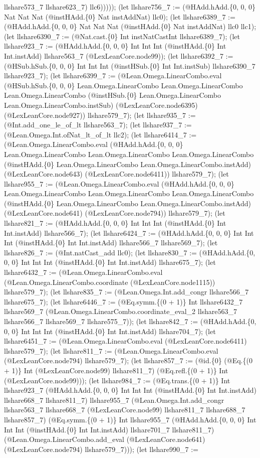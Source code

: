 \documentclass[11pt]{article}
\begin{document}
llshare573\_7 llshare623\_7) llc6))))); (let llshare756\_7 := (@HAdd.hAdd.\{0, 0, 0\} Nat Nat Nat (@instHAdd.\{0\} Nat instAddNat) llc0); (let llshare6389\_7 := (@HAdd.hAdd.\{0, 0, 0\} Nat Nat Nat (@instHAdd.\{0\} Nat instAddNat) llc0 llc1); (let llshare6390\_7 := (@Nat.cast.\{0\} Int instNatCastInt llshare6389\_7); (let llshare923\_7 := (@HAdd.hAdd.\{0, 0, 0\} Int Int Int (@instHAdd.\{0\} Int Int.instAdd) llshare563\_7 (@LexLeanCore.node99)); (let llshare6392\_7 := (@HSub.hSub.\{0, 0, 0\} Int Int Int (@instHSub.\{0\} Int Int.instSub) llshare6390\_7 llshare923\_7); (let llshare6399\_7 := (@Lean.Omega.LinearCombo.eval (@HSub.hSub.\{0, 0, 0\} Lean.Omega.LinearCombo Lean.Omega.LinearCombo Lean.Omega.LinearCombo (@instHSub.\{0\} Lean.Omega.LinearCombo Lean.Omega.LinearCombo.instSub) (@LexLeanCore.node6395) (@LexLeanCore.node927)) llshare579\_7); (let llshare935\_7 := (@Int.add\_one\_le\_of\_lt llshare563\_7); (let llshare937\_7 := (@Lean.Omega.Int.ofNat\_lt\_of\_lt llc2); (let llshare6414\_7 := (@Lean.Omega.LinearCombo.eval (@HAdd.hAdd.\{0, 0, 0\} Lean.Omega.LinearCombo Lean.Omega.LinearCombo Lean.Omega.LinearCombo (@instHAdd.\{0\} Lean.Omega.LinearCombo Lean.Omega.LinearCombo.instAdd) (@LexLeanCore.node643) (@LexLeanCore.node6411)) llshare579\_7); (let llshare955\_7 := (@Lean.Omega.LinearCombo.eval (@HAdd.hAdd.\{0, 0, 0\} Lean.Omega.LinearCombo Lean.Omega.LinearCombo Lean.Omega.LinearCombo (@instHAdd.\{0\} Lean.Omega.LinearCombo Lean.Omega.LinearCombo.instAdd) (@LexLeanCore.node641) (@LexLeanCore.node794)) llshare579\_7); (let llshare821\_7 := (@HAdd.hAdd.\{0, 0, 0\} Int Int Int (@instHAdd.\{0\} Int Int.instAdd) llshare566\_7); (let llshare6424\_7 := (@HAdd.hAdd.\{0, 0, 0\} Int Int Int (@instHAdd.\{0\} Int Int.instAdd) llshare566\_7 llshare569\_7); (let llshare826\_7 := (@Int.natCast\_add llc0); (let llshare830\_7 := (@HAdd.hAdd.\{0, 0, 0\} Int Int Int (@instHAdd.\{0\} Int Int.instAdd) llshare675\_7); (let llshare6432\_7 := (@Lean.Omega.LinearCombo.eval (@Lean.Omega.LinearCombo.coordinate (@LexLeanCore.node1115)) llshare579\_7); (let llshare835\_7 := (@Lean.Omega.Int.add\_congr llshare566\_7 llshare675\_7); (let llshare6446\_7 := (@Eq.symm.\{(0 + 1)\} Int llshare6432\_7 llshare569\_7 (@Lean.Omega.LinearCombo.coordinate\_eval\_2 llshare563\_7 llshare566\_7 llshare569\_7 llshare575\_7)); (let llshare842\_7 := (@HAdd.hAdd.\{0, 0, 0\} Int Int Int (@instHAdd.\{0\} Int Int.instAdd) llshare704\_7); (let llshare6451\_7 := (@Lean.Omega.LinearCombo.eval (@LexLeanCore.node6411) llshare579\_7); (let llshare811\_7 := (@Lean.Omega.LinearCombo.eval (@LexLeanCore.node794) llshare579\_7); (let llshare857\_7 := (@id.\{0\} (@Eq.\{(0 + 1)\} Int (@LexLeanCore.node99) llshare811\_7) (@Eq.refl.\{(0 + 1)\} Int (@LexLeanCore.node99))); (let llshare984\_7 := (@Eq.trans.\{(0 + 1)\} Int llshare923\_7 (@HAdd.hAdd.\{0, 0, 0\} Int Int Int (@instHAdd.\{0\} Int Int.instAdd) llshare668\_7 llshare811\_7) llshare955\_7 (@Lean.Omega.Int.add\_congr llshare563\_7 llshare668\_7 (@LexLeanCore.node99) llshare811\_7 llshare688\_7 llshare857\_7) (@Eq.symm.\{(0 + 1)\} Int llshare955\_7 (@HAdd.hAdd.\{0, 0, 0\} Int Int Int (@instHAdd.\{0\} Int Int.instAdd) llshare701\_7 llshare811\_7) (@Lean.Omega.LinearCombo.add\_eval (@LexLeanCore.node641) (@LexLeanCore.node794) llshare579\_7))); (let llshare990\_7 := 
\end{document}
